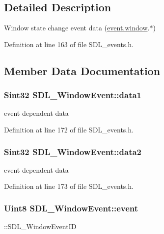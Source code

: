 \subsection{Detailed Description}
Window state change event data (\hyperlink{unionSDL__Event_a826936b3275406d857bc6654669fae71}{event.\+window}.$\ast$) 

Definition at line 163 of file S\+D\+L\+\_\+events.\+h.



\subsection{Member Data Documentation}
\hypertarget{structSDL__WindowEvent_a01da0025428d3434c80021f3e4089fec}{
\subsubsection[{data1}]{\setlength{\rightskip}{0pt plus 5cm}Sint32 S\+D\+L\+\_\+\+Window\+Event\+::data1}}\label{structSDL__WindowEvent_a01da0025428d3434c80021f3e4089fec}
event dependent data 

Definition at line 172 of file S\+D\+L\+\_\+events.\+h.

\hypertarget{structSDL__WindowEvent_af6cd0a21bc9ecadfee42f6a0147d7171}{
\subsubsection[{data2}]{\setlength{\rightskip}{0pt plus 5cm}Sint32 S\+D\+L\+\_\+\+Window\+Event\+::data2}}\label{structSDL__WindowEvent_af6cd0a21bc9ecadfee42f6a0147d7171}
event dependent data 

Definition at line 173 of file S\+D\+L\+\_\+events.\+h.

\hypertarget{structSDL__WindowEvent_a485cd1f07f0f22fdb9f4c4bf214011dc}{
\subsubsection[{event}]{\setlength{\rightskip}{0pt plus 5cm}Uint8 S\+D\+L\+\_\+\+Window\+Event\+::event}}\label{structSDL__WindowEvent_a485cd1f07f0f22fdb9f4c4bf214011dc}
\+::\+S\+D\+L\+\_\+\+Window\+Event\+I\+D 

